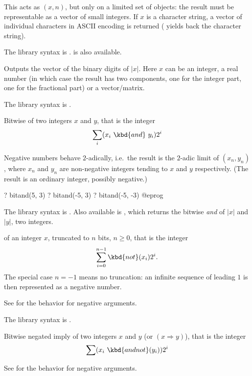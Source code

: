 This acts as $(x,n)$, but only on a limited set of objects:
the result must be representable as a vector of small integers.
If $x$ is a character string, a vector of individual characters in ASCII
encoding is returned ( yields back the character string).

The library syntax is .
 is also available.

\label{se:binary}
Outputs the vector of the binary digits of $|x|$.
Here $x$ can be an integer, a real number (in which case the result has two
components, one for the integer part, one for the fractional part) or a
vector/matrix.

The library syntax is .

\label{se:bitand}
Bitwise 
of two integers $x$ and $y$, that is the integer
$$\sum_i (x_i~\kbd{and}~y_i) 2^i$$

Negative numbers behave $2$-adically, i.e.~the result is the $2$-adic limit
of $(x_n,y_n)$, where $x_n$ and $y_n$ are non-negative integers
tending to $x$ and $y$ respectively. (The result is an ordinary integer,
possibly negative.)

\bprog
? bitand(5, 3)
? bitand(-5, 3)
? bitand(-5, -3)
@eprog

The library syntax is .
Also available is
, which returns the bitwise \emph{and}
of $|x|$ and $|y|$, two integers.

\label{se:bitneg}
 of an integer $x$,
truncated to $n$ bits, $n\geq 0$, that is the integer
$$\sum_{i=0}^{n-1} \kbd{not}(x_i) 2^i.$$
The special case $n=-1$ means no truncation: an infinite sequence of
leading $1$ is then represented as a negative number.

See  for the behavior for negative arguments.

The library syntax is .

\label{se:bitnegimply}
Bitwise negated imply of two integers $x$ and
$y$ (or  $(x \Rightarrow y)$), that is the integer $$\sum
(x_i~\kbd{and not}(y_i)) 2^i$$

See  for the behavior for negative arguments.

